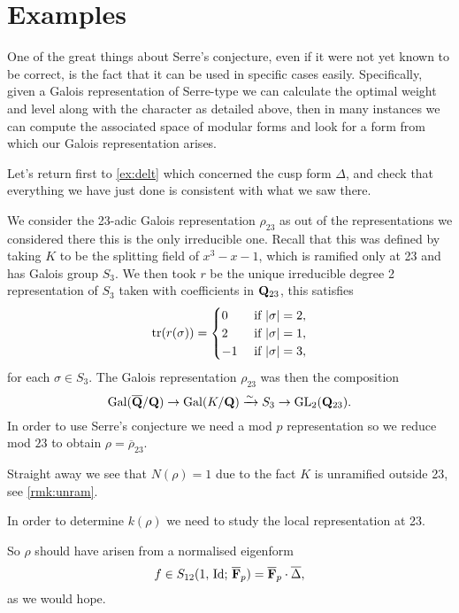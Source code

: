\documentclass[a4paper,12pt]{article}
\begin{document}
\section{Examples}
One of the great things about Serre's conjecture, even if it were not yet known to be correct, is the fact that it can be used in specific cases easily.
Specifically, given a Galois representation of Serre-type we can calculate the optimal weight and level along with the character as detailed above, then in many instances we can compute the associated space of modular forms and look for a form from which our Galois representation arises.

\begin{ex}
Let's return first to \cref{ex:delt} which concerned the cusp form $\Delta$, and check that everything we have just done is consistent with what we saw there. %

We consider the 23-adic Galois representation $\rho_{23}$ as out of the representations we considered there this is the only irreducible one.
Recall that this was defined by taking $K$ to be the splitting field of $x^3 - x - 1$, which is ramified only at 23 and has Galois group $S_3$.
We then took $r$ be the unique irreducible degree 2 representation of $S_3$ taken with coefficients in $\mathbf{Q}_{23}$, this satisfies
\[
\operatorname{tr}(r(\sigma)) = \begin{cases}
0 &\text{ if } |\sigma| = 2,\\
2 &\text{ if } |\sigma| = 1,\\
-1 &\text{ if } |\sigma| = 3,
\end{cases}
\]
for each $\sigma \in S_3$.
The Galois representation $\rho_{23}$ was then the composition
\[
\operatorname{Gal}(\overline{\mathbf{Q}}/\mathbf{Q}) \to \operatorname{Gal}(K/\mathbf{Q}) \xrightarrow{\sim} S_3 \to \operatorname{GL}_2(\mathbf{Q}_{23}).
\]
In order to use Serre's conjecture we need a mod $p$ representation so we reduce mod $23$ to obtain $\rho = \overline{\rho}_{23}$.

Straight away we see that $N(\rho) = 1$ due to the fact $K$ is unramified outside 23, see \cref{rmk:unram}.

In order to determine $k(\rho)$ we need to study the local representation at 23.



So $\rho$ should have arisen from a normalised eigenform
\[
f\in S_{12}(1,\,\mathrm{Id};\,\overline{\mathbf{F}}_p) = \overline{\mathbf{F}}_p\cdot \overline{\Delta},
\]
as we would hope.
\end{ex}
\end{document}
